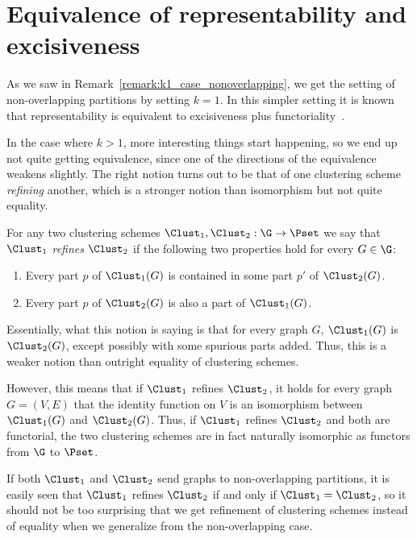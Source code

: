 \documentclass[a4paper,reqno,oneside]{article} %
\begin{document}
\section{Equivalence of representability and excisiveness}

As we saw in Remark~\ref{remark:k1_case_nonoverlapping}, we get the setting of non-overlapping partitions by setting $k=1$. In this simpler setting it is known that representability is equivalent to excisiveness plus functoriality~\cite{Carlsson_Memoli_Segarra_2021}.

In the case where $k > 1$, more interesting things start happening, so we end up not quite getting equivalence, since one of the directions of the equivalence weakens slightly. The right notion turns out to be that of one clustering scheme \emph{refining} another, which is a stronger notion than isomorphism but not quite equality.

\begin{definition}
    For any two clustering schemes $\Clust_1, \Clust_2: \G \to \Pset$ we say that $\Clust_1$ \emph{refines} $\Clust_2$ if the following two properties hold for every $G \in \G$:
    \begin{enumerate}
        \item Every part $p$ of $\Clust_1(G)$ is contained in some part $p'$ of $\Clust_2(G)$.
        \item Every part $p$ of $\Clust_2(G)$ is also a part of $\Clust_1(G)$.
    \end{enumerate}
\end{definition}

\begin{remark}
    Essentially, what this notion is saying is that for every graph $G$, $\Clust_1(G)$ is $\Clust_2(G)$, except possibly with some spurious parts added. Thus, this is a weaker notion than outright equality of clustering schemes. 
    
    However, this means that if $\Clust_1$ refines $\Clust_2$, it holds for every graph $G = (V,E)$ that the identity function on $V$ is an isomorphism between $\Clust_1(G)$ and $\Clust_2(G)$. Thus, if $\Clust_1$ refines $\Clust_2$ and both are functorial, the two clustering schemes are in fact naturally isomorphic as functors from $\G$ to $\Pset$.
\end{remark}

\begin{remark}
    If both $\Clust_1$ and $\Clust_2$ send graphs to non-overlapping partitions, it is easily seen that $\Clust_1$ refines $\Clust_2$ if and only if $\Clust_1 = \Clust_2$, so it should not be too surprising that we get refinement of clustering schemes instead of equality when we generalize from the non-overlapping case.
\end{remark}
\end{document}
